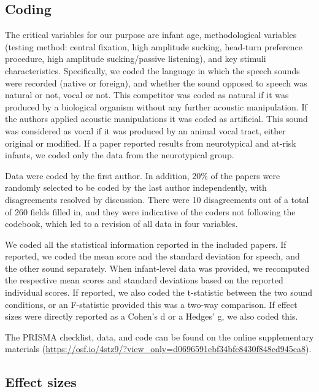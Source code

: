 \documentclass[man]{apa6}
\begin{document}
\subsection{Coding}\label{coding}

The critical variables for our purpose are infant age, methodological
variables (testing method: central fixation, high amplitude sucking,
head-turn preference procedure, high amplitude sucking/passive
listening), and key stimuli characteristics. Specifically, we coded the
language in which the speech sounds were recorded (native or foreign),
and whether the sound opposed to speech was natural or not, vocal or
not. This competitor was coded as natural if it was produced by a
biological organism without any further acoustic manipulation. If the
authors applied acoustic manipulations it was coded as artificial. This
sound was considered as vocal if it was produced by an animal vocal
tract, either original or modified. If a paper reported results from
neurotypical and at-risk infants, we coded only the data from the
neurotypical group.

Data were coded by the first author. In addition, 20\% of the papers
were randomly selected to be coded by the last author independently,
with disagreements resolved by discussion. There were 10 disagreements
out of a total of 260 fields filled in, and they were indicative of the
coders not following the codebook, which led to a revision of all data
in four variables.

We coded all the statistical information reported in the included
papers. If reported, we coded the mean score and the standard deviation
for speech, and the other sound separately. When infant-level data was
provided, we recomputed the respective mean scores and standard
deviations based on the reported individual scores. If reported, we also
coded the t-statistic between the two sound conditions, or an
F-statistic provided this was a two-way comparison. If effect sizes were
directly reported as a Cohen's d or a Hedges' g, we also coded this.

The PRISMA checklist, data, and code can be found on the online
supplementary materials
(\url{https://osf.io/4stz9/?view_only=d0696591ebf34bfc8430f848cd945ca8}).

\subsection{Effect sizes}\label{effect-sizes}
\end{document}
